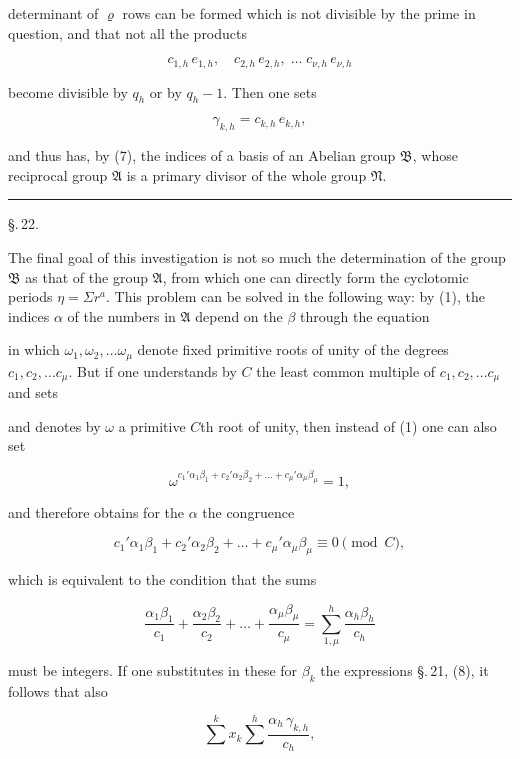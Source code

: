 
determinant of $\varrho$ rows can be formed which is not divisible by the
prime in question, and that not all the products

\[
c_{1,h}\,e_{1,h}, \quad c_{2,h}\,e_{2,h}, \; \dots \; c_{\nu,h}\,e_{\nu,h}
\]

become divisible by $q_h$ or by $q_h - 1$. Then one sets

\[
\gamma_{k,h} = c_{k,h}\,e_{k,h},
\]

and thus has, by (7), the indices of a basis of an Abelian group
$\mathfrak{B}$, whose reciprocal group $\mathfrak{A}$ is a primary
divisor of the whole group $\mathfrak{N}$.

\noindent\rule{4cm}{0.4pt}

\begin{center}
\S.\,22.

\end{center}

The final goal of this investigation is not so much the determination of
the group $\mathfrak{B}$ as that of the group $\mathfrak{A}$, from which
one can directly form the cyclotomic periods $\eta = \Sigma r^a$. This
problem can be solved in the following way: by (1), the indices $\alpha$
of the numbers in $\mathfrak{A}$ depend on the $\beta$ through the
equation


in which $\omega_1, \omega_2, \dots \omega_\mu$ denote fixed primitive
roots of unity of the degrees $c_1, c_2, \dots c_\mu$. But if one
understands by $C$ the least common multiple of $c_1, c_2, \dots c_\mu$
and sets


and denotes by $\omega$ a primitive $C$th root of unity, then instead of
(1) one can also set

\[
\omega^{c_1'\alpha_1\beta_1 + c_2'\alpha_2\beta_2 + \dots +
c_\mu'\alpha_\mu\beta_\mu} = 1,
\]

and therefore obtains for the $\alpha$ the congruence

\[
c_1'\alpha_1\beta_1 + c_2'\alpha_2\beta_2 + \dots +
c_\mu'\alpha_\mu\beta_\mu \equiv 0 \pmod{C},
\]

which is equivalent to the condition that the sums

\[
\frac{\alpha_1\beta_1}{c_1} + \frac{\alpha_2\beta_2}{c_2} + \dots +
\frac{\alpha_\mu\beta_\mu}{c_\mu} = \sum_{1,\mu}^{h} \frac{\alpha_h
\beta_h}{c_h}
\]

must be integers. If one substitutes in these for $\beta_k$ the
expressions \S.\,21, (8), it follows that also

\[
\sum^{k} x_k \sum^{h} \frac{\alpha_h\,\gamma_{k,h}}{c_h},
\]

